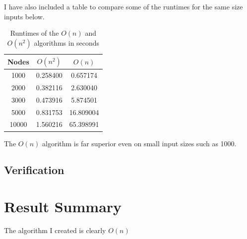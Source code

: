 \documentclass{article}
\begin{document}
	  I have also included a table to compare some of the runtimes for the same size inputs below.

	  \begin{center}
	  \begin{table}[H]
		\begin{tabular}{ |c|c|c| }
			\hline
			Nodes & $O(n^2)$ & $O(n)$ \\
			\hline
      1000 & 0.258400 & 0.657174 \\
      \hline
      2000 & 0.382116 & 2.630040 \\
      \hline
      3000 & 0.473916 & 5.874501 \\
      \hline
      5000 & 0.831753 & 16.809004 \\
      \hline
      10000 & 1.560216 & 65.398991 \\
			\hline
		\end{tabular}
		\caption{Runtimes of the $O(n)$ and $O(n^2)$ algorithms in seconds}
	  \end{table}
	  \end{center}

	  The $O(n)$ algorithm is far superior even on small input sizes such as 1000.  

	\subsection{Verification}

\section{Result Summary}
  The algorithm I created is clearly $O(n)$

\printbibliography
\end{document}
